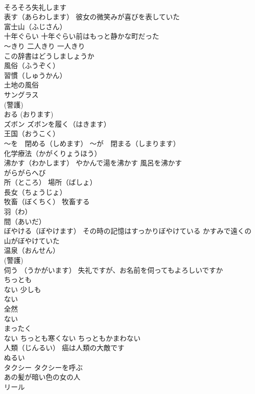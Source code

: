 \documentclass[8pt]{extreport}
\begin{document}
\begin{CJK}{UTF8}{min}
\\	そろそろ失礼します
\\	表す（あらわします） 彼女の微笑みが喜びを表していた
\\	富士山（ふじさん）
\\	十年ぐらい 十年ぐらい前はもっと静かな町だった
\\	～きり 二人きり 一人きり
\\	この辞書はどうしましょうか
\\	風俗（ふうぞく）
\\	習慣（しゅうかん） 
\\	土地の風俗
\\	サングラス
\\	(警護) 
\\	おる (おります)
\\	ズボン ズボンを履く（はきます）
\\	王国（おうこく）
\\	～を　閉める（しめます） ～が　閉まる（しまります）
\\	化学療法（かがくりょうほう）
\\	沸かす（わかします） やかんで湯を沸かす 風呂を沸かす
\\	がらがらへび
\\	所（ところ） 場所（ばしょ）
\\	長女（ちょうじょ）
\\	牧畜（ぼくちく） 牧畜する
\\	羽（わ）
\\	間（あいだ）
\\	ぼやける（ぼやけます） その時の記憶はすっかりぼやけている かすみで遠くの山がぼやけていた
\\	温泉（おんせん）
\\	(警護) 
\\	伺う （うかがいます） 失礼ですが、お名前を伺ってもよろしいですか
\\	ちっとも　
\\	ない 少しも　
\\	ない 
\\	全然　
\\	ない 
\\	まったく 
\\	ない ちっとも寒くない ちっともかまわない
\\	人類（じんるい） 癌は人類の大敵です
\\	ぬるい
\\	タクシー タクシーを呼ぶ
\\	あの髪が暗い色の女の人
\\	リール 

\end{CJK}
\end{document}
